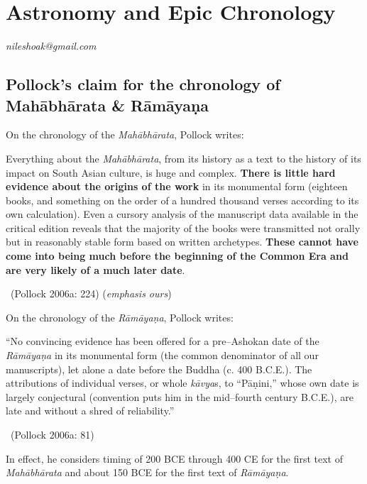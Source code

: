 
\chapter{Astronomy and Epic Chronology}\label{chapter2}


\begin{flushright}
\textit{nileshoak@gmail.com}
\end{flushright}


\section*{Pollock’s claim for the chronology of Mahābhārata \& Rāmāyaṇa}

On the chronology of the \textit{Mahābhārata}, Pollock writes:

\begin{myquote}
Everything about the \textit{Mahābhārata}, from its history as a text to the history of its impact on South Asian culture, is huge and complex. \textbf{There is little hard evidence about the origins of the work} in its monumental form (eighteen books, and something on the order of a hundred thousand verses according to its own calculation). Even a cursory analysis of the manuscript data available in the critical edition reveals that the majority of the books were transmitted not orally but in reasonably stable form based on written archetypes.\textbf{ These cannot have come into being much before the beginning of the Common Era and are very likely of a much later date}. 

~\hfill (Pollock 2006a: 224) (\textit{emphasis ours})
\end{myquote}

On the chronology of the \textit{Rāmāyaṇa}, Pollock writes:

\begin{myquote}
“No convincing evidence has been offered for a pre–Ashokan date of the \textit{Rāmāyaṇa} in its monumental form (the common denominator of all our manuscripts), let alone a date before the Buddha (c. 400 B.C.E.). The attributions of individual verses, or whole \textit{kāvya}s, to “Pāṇini,” whose own date is largely conjectural (convention puts him in the mid–fourth century B.C.E.), are late and without a shred of reliability.” 

~\hfill (Pollock 2006a: 81)
\end{myquote}

In effect, he considers timing of 200 BCE through 400 CE for the first text of \textit{Mahābhārata} and about 150 BCE for the first text of \textit{Rāmāyaṇa}.


